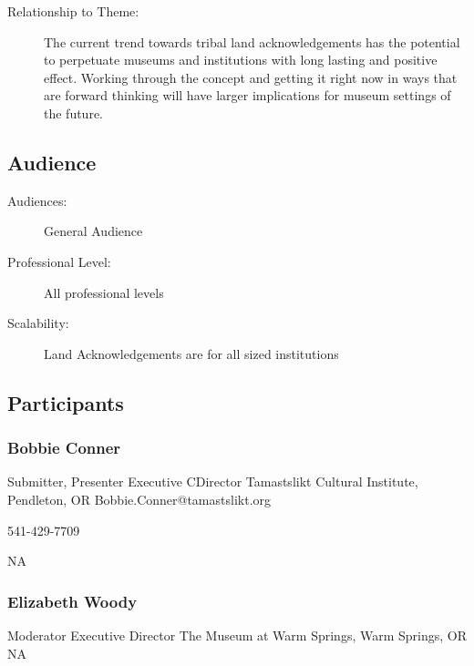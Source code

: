 \documentclass{report}
\begin{document}
\begin{description}
							    \item [Relationship to Theme:]The current trend towards tribal land acknowledgements has the potential to perpetuate museums and institutions with long lasting and positive effect. Working through the concept and getting it right now in ways that are forward thinking will have larger implications for museum settings of the future.
							    
                \end{description}
              \subsection*{Audience}
                \begin{description}
                  \item [Audiences:]General Audience~
                  \item[Professional Level:]All professional levels~
                \item[Scalability:] Land Acknowledgements are for all sized institutions 

							
              \end{description}
            \subsection*{Participants}
              \subsubsection*{ Bobbie Conner }
              Submitter, Presenter\newline
              Executive CDirector\newline
              Tamastslikt Cultural Institute, Pendleton, OR
              \newline
              Bobbie.Conner@tamastslikt.org\newline
              
              541-429-7709\newline

              NA\newline


              
                \subsubsection*{ Elizabeth  Woody  }
                Moderator\newline
                Executive Director\newline
                The Museum at Warm Springs, Warm Springs, OR
                \newline
                NA\newline
                
\end{document}
